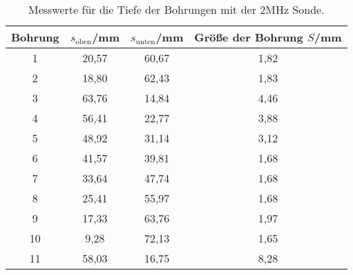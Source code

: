 \begin{table}[H]
  \centering
  \caption{Messwerte für die Tiefe der Bohrungen mit der 2\;MHz Sonde.}
  \label{tab:tab1}
    \begin{tabular}{c c c c}
    \toprule
    Bohrung & $s_{\text{oben}}$/\;mm & $s_{\text{unten}}$/\;mm & Größe der Bohrung $S$/\;mm\\
    \midrule
    1& 20,57 & 60,67 & 1,82 \\
    2& 18,80 & 62,43 & 1,83\\
    3& 63,76 & 14,84 & 4,46\\
    4 & 56,41 & 22,77 & 3,88\\
    5& 48,92 & 31,14 & 3,12\\
    6& 41,57 & 39,81 & 1,68\\
    7& 33,64 & 47,74 & 1,68\\
    8& 25,41 & 55,97 & 1,68\\
    9& 17,33 & 63,76 & 1,97\\
    10 & 9,28 & 72,13 & 1,65\\
    11 & 58,03 & 16,75 & 8,28\\
    \bottomrule
    \end{tabular}
  \end{table}
